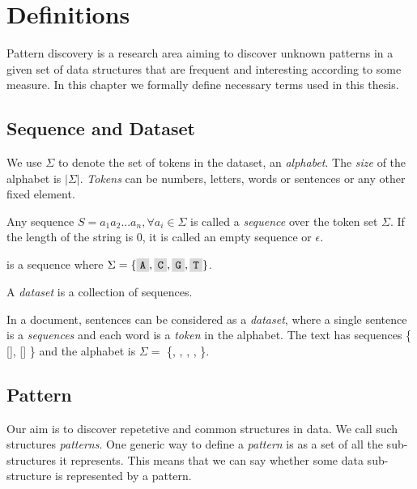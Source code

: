\chapter{Definitions}
\label{c:definitions}

Pattern discovery is a research area aiming to discover unknown patterns in a given set of data structures that are frequent and interesting according to some measure. In this chapter we formally define necessary terms used in this thesis.

\section{Sequence and Dataset}

We use $\Sigma$ to denote the set of tokens in the dataset, an \emph{alphabet}. The \emph{size} of the alphabet is $|\Sigma|$. \emph{Tokens} can be numbers, letters, words or sentences or any other fixed element.

Any sequence $S=a_1 a_2 ... a_n, \forall a_i \in \Sigma$ is called a \emph{sequence} over the token set $\Sigma$. If the length of the string is $0$, it is called an empty sequence or $\epsilon$.

\begin{exmp}
 is a sequence where $\Sigma = \{\R{A}, \R{C}, \R{G}, \R{T}\}$.
\end{exmp}

A \emph{dataset} is a collection of sequences.

\begin{exmp}
In a document, sentences can be considered as a \emph{dataset}, where a single sentence is a \emph{sequences} and each word is a \emph{token} in the alphabet. The text  has sequences \{ [], [] \} and the alphabet is $\Sigma =$ \{, , , , \}.	
\end{exmp}

\section{Pattern}

Our aim is to discover repetetive and common structures in data. We call such structures \emph{patterns}. One generic way to define a \emph{pattern} is as a set of all the sub-structures it represents. This means that we can say whether some data sub-structure is represented by a pattern.

